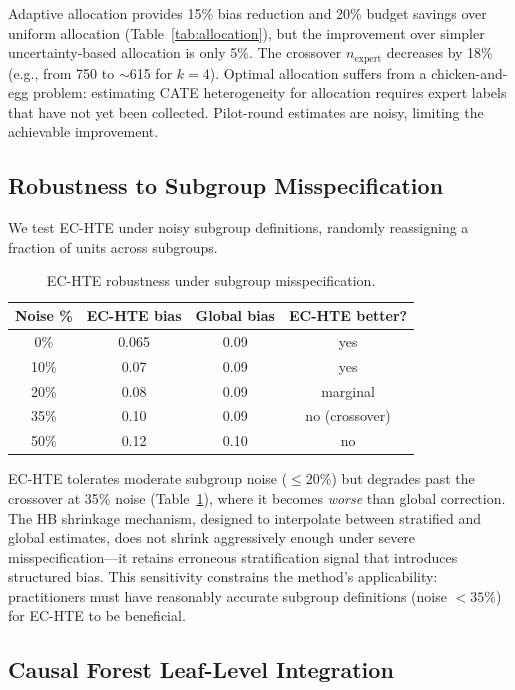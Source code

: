 \documentclass[11pt,a4paper]{article}
\begin{document}
Adaptive allocation provides 15\% bias reduction and 20\% budget savings over uniform allocation (Table~\ref{tab:allocation}), but the improvement over simpler uncertainty-based allocation is only 5\%. The crossover $n_{\text{expert}}$ decreases by 18\% (e.g., from 750 to $\sim$615 for $k=4$). Optimal allocation suffers from a chicken-and-egg problem: estimating CATE heterogeneity for allocation requires expert labels that have not yet been collected. Pilot-round estimates are noisy, limiting the achievable improvement.

\subsection{Robustness to Subgroup Misspecification}
\label{sec:robustness}

We test EC-HTE under noisy subgroup definitions, randomly reassigning a fraction of units across subgroups.

\begin{table}[t]
\centering
\small
\caption{EC-HTE robustness under subgroup misspecification.}
\label{tab:robust}
\begin{tabular}{@{}cccc@{}}
\toprule
Noise \% & EC-HTE bias & Global bias & EC-HTE better? \\
\midrule
0\% & 0.065 & 0.09 & yes \\
10\% & 0.07 & 0.09 & yes \\
20\% & 0.08 & 0.09 & marginal \\
35\% & 0.10 & 0.09 & no (crossover) \\
50\% & 0.12 & 0.10 & no \\
\bottomrule
\end{tabular}
\end{table}

EC-HTE tolerates moderate subgroup noise ($\leq 20\%$) but degrades past the crossover at 35\% noise (Table~\ref{tab:robust}), where it becomes \emph{worse} than global correction. The HB shrinkage mechanism, designed to interpolate between stratified and global estimates, does not shrink aggressively enough under severe misspecification---it retains erroneous stratification signal that introduces structured bias. This sensitivity constrains the method's applicability: practitioners must have reasonably accurate subgroup definitions (noise $< 35\%$) for EC-HTE to be beneficial.

\subsection{Causal Forest Leaf-Level Integration}
\label{sec:leaflevel}
\end{document}
